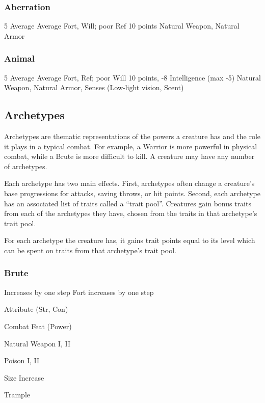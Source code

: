 \subsubsection{Aberration}
 5
 Average
 Average Fort, Will; poor Ref
 10 points
 Natural Weapon, Natural Armor

\subsubsection{Animal}
 5
 Average
 Average Fort, Ref; poor Will
 10 points, -8 Intelligence (max -5)
 Natural Weapon, Natural Armor, Senses (Low-light vision, Scent)

\subsection{Archetypes}
Archetypes are thematic representations of the powers a creature has and the role it plays in a typical combat. For example, a Warrior is more powerful in physical combat, while a Brute is more difficult to kill. A creature may have any number of archetypes.

Each archetype has two main effects. First, archetypes often change a creature's base progressions for attacks, saving throws, or hit points. Second, each archetype has an associated list of traits called a ``trait pool''. Creatures gain bonus traits from each of the archetypes they have, chosen from the traits in that archetype's trait pool.

For each archetype the creature has, it gains trait points equal to its level which can be spent on traits from that archetype's trait pool.

\subsubsection{Brute}
 Increases by one step
 Fort increases by one step
\begin{itemize*}
    \item Attribute (Str, Con)
    \item Combat Feat (Power)
    \item Natural Weapon I, II
    \item Poison I, II
    \item Size Increase
    \item Trample
\end{itemize*}

